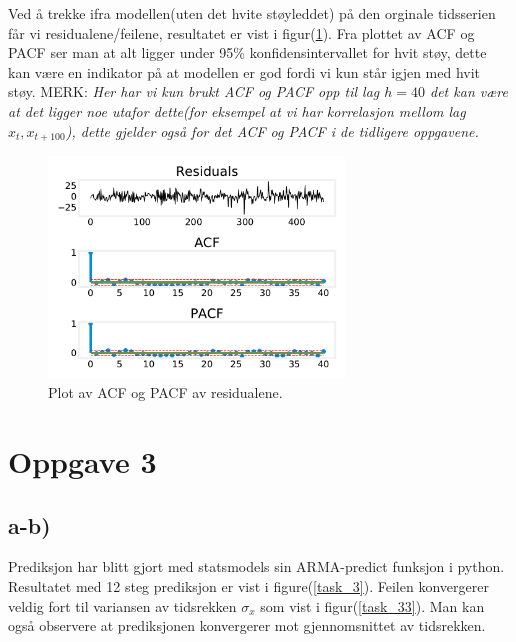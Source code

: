 Ved å trekke ifra modellen(uten det hvite støyleddet) på den orginale tidsserien får vi residualene/feilene, resultatet er vist i figur(\ref{task_2a}). Fra plottet av ACF og PACF ser man at alt ligger under 95\% konfidensintervallet for hvit støy, dette kan være en indikator på at modellen er god fordi vi kun står igjen med hvit støy. MERK: \emph{Her har vi kun brukt ACF og PACF opp til lag $h = 40$ det kan være at det ligger noe utafor dette(for eksempel at vi har korrelasjon mellom lag $x_{t}, x_{t+100}$), dette gjelder også for det ACF og PACF i de tidligere oppgavene.}

\begin{figure}[hbt!]
    {\centering
        \includegraphics[width=0.70\textwidth]{task_2a.pdf}
        \caption{Plot av ACF og PACF av residualene.}
        \label{task_2a}
    \par}
    \end{figure}






\section{Oppgave 3}
\subsection{a-b)}

Prediksjon har blitt gjort med statsmodels sin ARMA-predict funksjon i python. Resultatet med 12 steg prediksjon er vist i figure(\ref{task_3}). Feilen konvergerer veldig fort til variansen av tidsrekken $\sigma_{x}$ som vist i figur(\ref{task_33}). Man kan også observere at prediksjonen konvergerer mot gjennomsnittet av tidsrekken.


